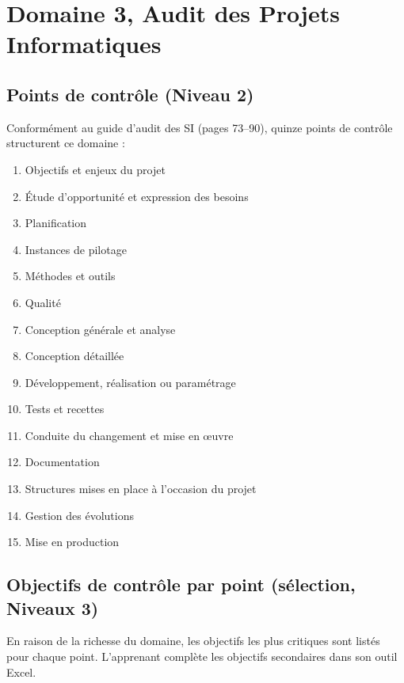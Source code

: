 \section{Domaine 3, Audit des Projets Informatiques}
\label{sec:decomp-projets}

\subsection{Points de contrôle (Niveau 2)}

Conformément au guide d'audit des SI (pages 73--90), quinze points de contrôle structurent ce domaine :

\begin{enumerate}
    \item Objectifs et enjeux du projet
    \item Étude d'opportunité et expression des besoins
    \item Planification
    \item Instances de pilotage
    \item Méthodes et outils
    \item Qualité
    \item Conception générale et analyse
    \item Conception détaillée
    \item Développement, réalisation ou paramétrage
    \item Tests et recettes
    \item Conduite du changement et mise en \oe{}uvre
    \item Documentation
    \item Structures mises en place à l'occasion du projet
    \item Gestion des évolutions
    \item Mise en production
\end{enumerate}

\subsection{Objectifs de contrôle par point (sélection, Niveaux 3)}

En raison de la richesse du domaine, les objectifs les plus critiques sont listés pour chaque point. L'apprenant complète les objectifs secondaires dans son outil Excel.

